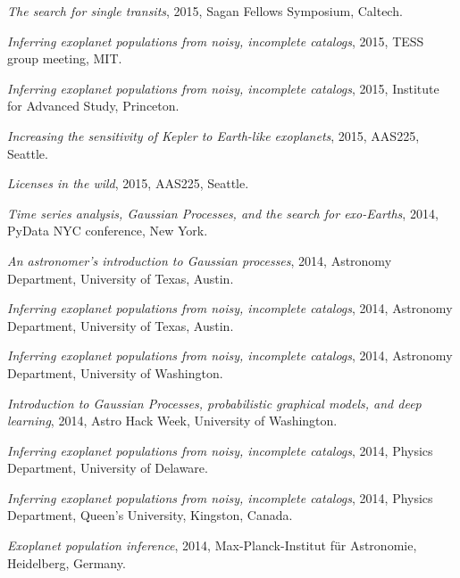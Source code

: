 \documentclass[12pt,letterpaper]{article}
\begin{document}
\begin{list}{}{\cvlist}
\item \emph{The search for single transits},
    2015, Sagan Fellows Symposium, Caltech.

\item \emph{Inferring exoplanet populations from noisy, incomplete catalogs},
    2015, TESS group meeting, MIT.

\item \emph{Inferring exoplanet populations from noisy, incomplete catalogs},
    2015, Institute for Advanced Study, Princeton.

\item \emph{Increasing the sensitivity of Kepler to Earth-like exoplanets},
    2015, AAS225, Seattle.

\item \emph{Licenses in the wild},
    2015, AAS225, Seattle.

\item \emph{Time series analysis, Gaussian Processes, and the search for
            exo-Earths},
    2014, PyData NYC conference, New York.

\item \emph{An astronomer's introduction to Gaussian processes},
    2014, Astronomy Department, University of Texas, Austin.

\item \emph{Inferring exoplanet populations from noisy, incomplete catalogs},
    2014, Astronomy Department, University of Texas, Austin.

\item \emph{Inferring exoplanet populations from noisy, incomplete catalogs},
    2014, Astronomy Department, University of Washington.

\item \emph{Introduction to Gaussian Processes, probabilistic graphical
            models, and deep learning},
    2014, Astro Hack Week, University of Washington.

\item \emph{Inferring exoplanet populations from noisy, incomplete catalogs},
    2014, Physics Department, University of Delaware.

\item \emph{Inferring exoplanet populations from noisy, incomplete catalogs},
    2014, Physics Department, Queen's University, Kingston, Canada.

\item \emph{Exoplanet population inference},
    2014, Max-Planck-Institut f\"ur Astronomie, Heidelberg, Germany.


\end{list}
\end{document}
